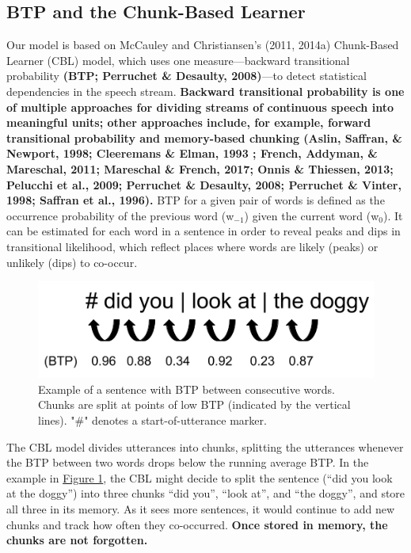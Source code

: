 \documentclass[man,mask,floatsintext]{apa6}
\begin{document}
\subsection{BTP and the Chunk-Based
Learner}\label{btp-and-the-chunk-based-learner}

Our model is based on McCauley and Christiansen's (2011, 2014a)
Chunk-Based Learner (CBL) model, which uses one measure---backward
transitional probability \textbf{(BTP; Perruchet \& Desaulty,
2008)}---to detect statistical dependencies in the speech stream.
\textbf{Backward transitional probability is one of multiple approaches
for dividing streams of continuous speech into meaningful units; other
approaches include, for example, forward transitional probability and
memory-based chunking (Aslin, Saffran, \& Newport, 1998; Cleeremans \&
Elman, 1993 ; French, Addyman, \& Mareschal, 2011; Mareschal \& French,
2017; Onnis \& Thiessen, 2013; Pelucchi et al., 2009; Perruchet \&
Desaulty, 2008; Perruchet \& Vinter, 1998; Saffran et al., 1996).} BTP
for a given pair of words is defined as the occurrence probability of
the previous word (w\(_{-1}\)) given the current word (w\(_0\)). It can
be estimated for each word in a sentence in order to reveal peaks and
dips in transitional likelihood, which reflect places where words are
likely (peaks) or unlikely (dips) to co-occur.

\begin{figure}
\includegraphics[width=0.75\linewidth]{images/chunking_mechanism} \caption{Example of a sentence with BTP between consecutive words. Chunks are split at points of low BTP (indicated by the vertical lines). "\#" denotes a start-of-utterance marker.}\label{fig:fig1}
\end{figure}

The CBL model divides utterances into chunks, splitting the utterances
whenever the BTP between two words drops below the running average BTP.
In the example in \protect\hyperlink{fig1}{Figure 1}, the CBL might
decide to split the sentence (\enquote{did you look at the doggy}) into
three chunks \enquote{did you}, \enquote{look at}, and \enquote{the
doggy}, and store all three in its memory. As it sees more sentences, it
would continue to add new chunks and track how often they co-occurred.
\textbf{Once stored in memory, the chunks are not forgotten.}
\end{document}
